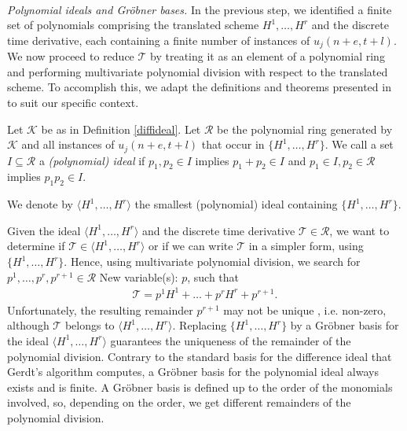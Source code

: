 \documentclass[runningheads]{llncs}
\newcommand{\1}{\chi}
\begin{document}
\\
\emph{Polynomial ideals and Gr{\"o}bner bases.}\label{polid}
In the previous step, we identified a finite set of polynomials comprising the translated scheme \({H^1,\ldots,H^r}\) and the discrete time derivative, each containing a finite number of instances of \(u_j(n+e,t+l)\). We now proceed to reduce \(\mathcal{T}\) by treating it as an element of a polynomial ring and performing multivariate polynomial division with respect to the translated scheme. To accomplish this, we adapt the definitions and theorems presented in \cite{hibi13} to suit our specific context.
\begin{definition}
	Let \(\mathcal{K}\) be as in Definition \ref{diffideal}. Let \(\mathcal{R}\) be the polynomial ring generated by \(\mathcal{K}\) and all instances of \(u_j(n+e,t+l)\) that occur in \(\{H^1,\ldots,H^r\}\).
	We call a set \( I\subseteq \mathcal{R}\) a \emph{(polynomial) ideal} if
	\(p_1,p_2\in I\) implies \(p_1+p_2\in I\) and
	\(p_1\in I,p_2\in\mathcal{R}\) implies \(p_1p_2\in I\).
\end{definition}
\begin{definition}
	We denote by \(\langle H^1,\ldots,H^r\rangle\) the smallest (polynomial) ideal containing \(\{H^1,\ldots,H^r\}\).
\end{definition}
Given the ideal \(\langle H^1,\ldots,H^r\rangle\) and the discrete time derivative \(\mathcal{T}\in\mathcal{R}\), we want to determine if \(\mathcal{T}\in\langle H^1,\ldots,H^r\rangle\) or if we can write \(\mathcal{T}\) in a simpler form, using \(\{H^1,\ldots,H^r\}\).
Hence, using multivariate polynomial division, we search for \(p^1,\ldots,p^r,p^{r+1}\in\mathcal{R}\)
{\color{blue} New variable(s): \(p\),  }
 such that
\begin{gather*}
	\mathcal{T}=p^1H^1+\ldots+p^rH^r+p^{r+1}.
\end{gather*}
Unfortunately, the resulting remainder \(p^{r+1}\) may not be unique \cite[page 14, Example 1.2.3]{hibi13}, i.e. non-zero, although \(\mathcal{T}\) belongs to \(\langle H^1,\ldots,H^r \rangle\). 
Replacing \(\{H^1,\ldots,H^r\}\) by a Gr{\"o}bner basis for the ideal \(\langle H^1,\ldots,H^r \rangle\) guarantees the uniqueness of the remainder of the polynomial division. 
Contrary to the standard basis for the difference ideal that Gerdt's algorithm computes, a Gr{\"o}bner basis for the polynomial ideal always exists and is finite.
A Gr{\"o}bner basis is defined up to the order of the monomials involved, so, depending on the order, we get different remainders of the polynomial division.
\end{document}
